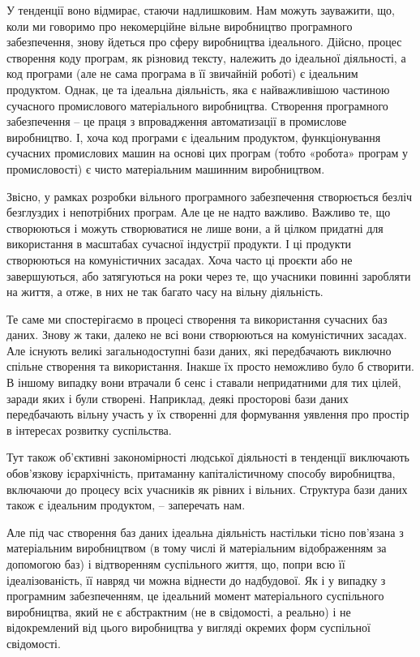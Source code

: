 \documentclass[../main]{subfiles}
\begin{document}
У тенденції воно відмирає, стаючи надлишковим. Нам можуть зауважити, що, коли ми говоримо про некомерційне вільне виробництво програмного забезпечення, знову йдеться про сферу виробництва ідеального. Дійсно, процес створення коду програм, як різновид тексту, належить до ідеальної діяльності, а код програми (але не сама програма в її звичайній роботі) є ідеальним продуктом. Однак, це та ідеальна діяльність, яка є найважливішою частиною сучасного промислового матеріального виробництва. Створення програмного забезпечення – це праця з впровадження автоматизації в промислове виробництво. І, хоча код програми є ідеальним продуктом, функціонування сучасних промислових машин на основі цих програм (тобто «робота» програм у промисловості) є чисто матеріальним машинним виробництвом.

Звісно, у рамках розробки вільного програмного забезпечення створюється безліч безглуздих і непотрібних програм. Але це не надто важливо. Важливо те, що створюються і можуть створюватися не лише вони, а й цілком придатні для використання в масштабах сучасної індустрії продукти. І ці продукти створюються на комуністичних засадах. Хоча часто ці проєкти або не завершуються, або затягуються на роки через те, що учасники повинні заробляти на життя, а отже, в них не так багато часу на вільну діяльність.

Те саме ми спостерігаємо в процесі створення та використання сучасних баз даних. Знову ж таки, далеко не всі вони створюються на комуністичних засадах. Але існують великі загальнодоступні бази даних, які передбачають виключно спільне створення та використання. Інакше їх просто неможливо було б створити. В іншому випадку вони втрачали б сенс і ставали непридатними для тих цілей, заради яких і були створені. Наприклад, деякі просторові бази даних передбачають вільну участь у їх створенні для формування уявлення про простір в інтересах розвитку суспільства.

Тут також об’єктивні закономірності людської діяльності в тенденції виключають обов’язкову ієрархічність, притаманну капіталістичному способу виробництва, включаючи до процесу всіх учасників як рівних і вільних. Структура бази даних також є ідеальним продуктом, – заперечать нам.

Але під час створення баз даних ідеальна діяльність настільки тісно пов’язана з матеріальним виробництвом (в тому числі й матеріальним відображенням за допомогою баз) і відтворенням суспільного життя, що, попри всю її ідеалізованість, її навряд чи можна віднести до надбудової. Як і у випадку з програмним забезпеченням, це ідеальний момент матеріального суспільного виробництва, який не є абстрактним (не в свідомості, а реально) і не відокремлений від цього виробництва у вигляді окремих форм суспільної свідомості.
\end{document}

